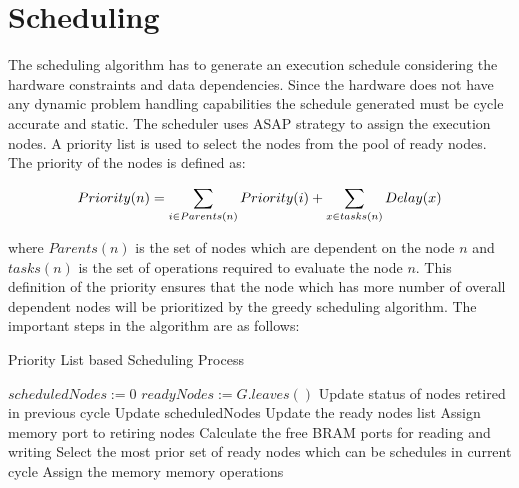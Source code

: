 \section{Scheduling}

The scheduling algorithm has to generate an execution schedule considering 
the hardware constraints and data dependencies. Since the hardware does not have
any dynamic problem handling capabilities the schedule generated must be 
cycle accurate and static. The scheduler uses ASAP strategy to assign the execution nodes.
A priority list is used to select the nodes from the pool of ready nodes. The priority
of the nodes is defined as:

\begin{equation}
    \centering
    Priority(n) = \sum_{i \in Parents(n)} Priority(i) + \sum_{x \in tasks(n)} Delay(x)
\end{equation}

where $Parents(n)$ is the set of nodes which are dependent on the node $n$ and $tasks(n)$ is the 
set of operations required to evaluate the node $n$. This definition of the priority 
ensures that the node which has more number of overall dependent nodes will be prioritized
by the greedy scheduling algorithm.
The important steps in the algorithm are as follows:

\begin{algorithm}
    \caption{Priority List based Scheduling Process}
        \label{algo:sch:sch}
    \begin{algorithmic}[1]
        \Statex
        \State $scheduledNodes := 0$
        \State $readyNodes := G.leaves()$
            \State Update status of nodes retired in previous cycle
            \State Update scheduledNodes
            \State Update the ready nodes list
            \State Assign memory port to retiring nodes
            \State Calculate the free BRAM ports for reading and writing
            \State Select the most prior set of ready nodes which can be schedules in current cycle
            \State Assign the memory memory operations
        \EndWhile
    \end{algorithmic}
\end{algorithm}

